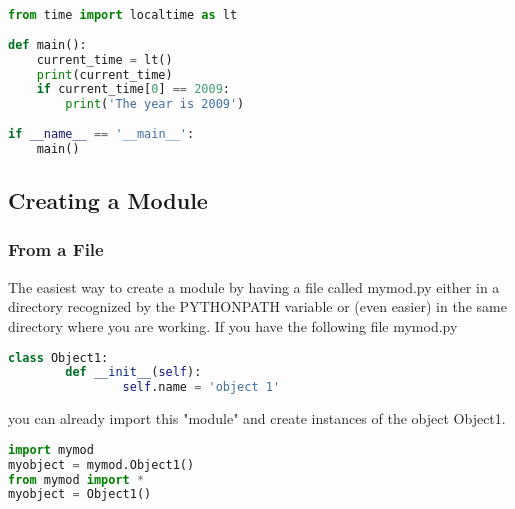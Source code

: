 \lstset{basicstyle=\scriptsize, numbers=left, captionpos=b, tabsize=4}
\begin{lstlisting}[caption=Alias Module,language={Python},
xleftmargin=15pt, label=lst:aliasmodule]
from time import localtime as lt 
 
def main():
    current_time = lt()
    print(current_time)
    if current_time[0] == 2009: 
        print('The year is 2009')
 
if __name__ == '__main__': 
    main()
\end{lstlisting}

\subsection{Creating a Module}
\subsubsection{From a File}
The easiest way to create a module by having a file called mymod.py either in a
directory recognized by the PYTHONPATH variable or (even easier) in the same
directory where you are working. If you have the following file mymod.py
\lstset{basicstyle=\scriptsize, numbers=left, captionpos=b, tabsize=4}
\begin{lstlisting}[caption=Module File,language={Python},
xleftmargin=15pt, label=lst:modulefile]
class Object1:
        def __init__(self):
                self.name = 'object 1'
\end{lstlisting}

you can already import this "module" and create instances of the object Object1.
\lstset{basicstyle=\scriptsize, numbers=left, captionpos=b, tabsize=4}
\begin{lstlisting}[caption=Use of selfmade Module,language={Python},
xleftmargin=15pt, label=lst:useofselfmademodule]
import mymod
myobject = mymod.Object1()
from mymod import *
myobject = Object1()
\end{lstlisting}

